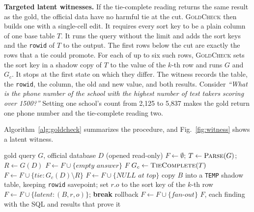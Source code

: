 \documentclass[conference]{IEEEtran}
\newcommand{\sys}{\textsc{GoldCheck}}
\begin{document}
\textbf{Targeted latent witnesses.} If the tie-complete reading returns the same
result as the gold, the official data have no harmful tie at the cut. \sys{}
then builds one with a single-cell edit. It requires every sort key to be a
plain column of one base table $T$. It runs the query without the limit and adds
the sort keys and the \texttt{rowid} of $T$ to the output. The first rows below
the cut are exactly the rows that a tie could promote. For each of up to six such
rows, \sys{} sets the sort key in a shadow copy of $T$ to the value of the $k$-th
row and runs $G$ and $G_c$. It stops at the first state on which they differ.
The witness records the table, the \texttt{rowid}, the column, the old and new
value, and both results. Consider \emph{``What is the phone number of the school
with the highest number of test takers scoring over 1500?''} Setting one
school's count from 2,125 to 5,837 makes the gold return one phone number and
the tie-complete reading two.

Algorithm~\ref{alg:goldcheck} summarizes the procedure, and
Fig.~\ref{fig:witness} shows a latent witness.

\begin{algorithm}[t]
\caption{\sys{} for one gold query}
\label{alg:goldcheck}
\footnotesize
\begin{algorithmic}[1]
\Require gold query $G$, official database $D$ (opened read-only)
\State $F \gets \emptyset$;\; $T \gets \textsc{Parse}(G)$;\; $R \gets G(D)$
  \State $F \gets F \cup \{\textit{empty answer}\}$
\EndIf
{} \Return $F$ 
\EndIf
{}
  \State $G_c \gets \textsc{TieComplete}(T)$
    \State $F \gets F \cup \{\textit{tie}: G_c(D) \setminus R\}$
  \EndIf
    \State $F \gets F \cup \{\textit{NULL at top}\}$
  \EndIf
    \State copy $B$ into a \texttt{TEMP} shadow table, keeping \texttt{rowid}
      \State savepoint; set $r.o$ to the sort key of the $k$-th row
        \State $F \gets F \cup \{\textit{latent}: (B, r, o)\}$; \textbf{break}
      \EndIf
      \State rollback
    \EndFor
  \EndIf
\EndIf
{}
      \State $F \gets F \cup \{\textit{fan-out}\}$
    \EndIf
  \EndIf
\EndFor
\State \Return $F$, each finding with the SQL and results that prove it
\end{algorithmic}
\end{algorithm}
\end{document}
